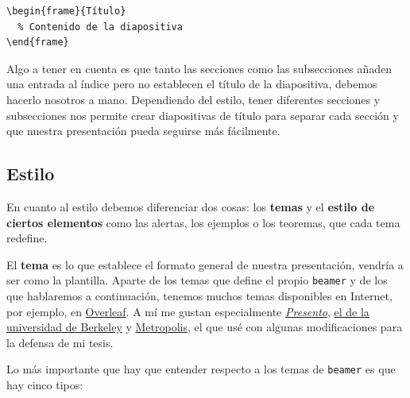 \begin{lstlisting}[language={[latex]tex}]
\begin{frame}{Título}
  % Contenido de la diapositiva
\end{frame}
\end{lstlisting}

Algo a tener en cuenta es que tanto las secciones como las subsecciones
añaden una entrada al índice pero no establecen el título de la
diapositiva, debemos hacerlo nosotros a mano. Dependiendo del estilo,
tener diferentes secciones y subsecciones nos permite crear diapositivas
de título para separar cada sección y que nuestra presentación pueda
seguirse más fácilmente.

\subsection{Estilo}

En cuanto al estilo debemos diferenciar dos cosas: los \textbf{temas} y
el \textbf{estilo de ciertos elementos} como las alertas, los ejemplos o
los teoremas, que cada tema redefine.

El \textbf{tema} es lo que establece el formato general de nuestra
presentación, vendría a ser como la plantilla. Aparte de los temas que
define el propio \lstinline!beamer! y de los que hablaremos a
continuación, tenemos muchos temas disponibles en Internet, por ejemplo,
en
\href{https://www.overleaf.com/latex/templates/tagged/presentation}{Overleaf}.
A mí me gustan especialmente
\href{https://www.overleaf.com/9480607mxqxvhczzvhr\#/34336424/}{\emph{Presento}},
\href{https://www.overleaf.com/9480660qtjkqtjfqhny\#/34336601/}{el de la
universidad de Berkeley} y
\href{https://www.ctan.org/pkg/beamertheme-metropolis}{Metropolis}, el
que usé con algunas modificaciones para la defensa de mi tesis.

Lo más importante que hay que entender respecto a los temas de
\lstinline!beamer! es que hay cinco tipos:

